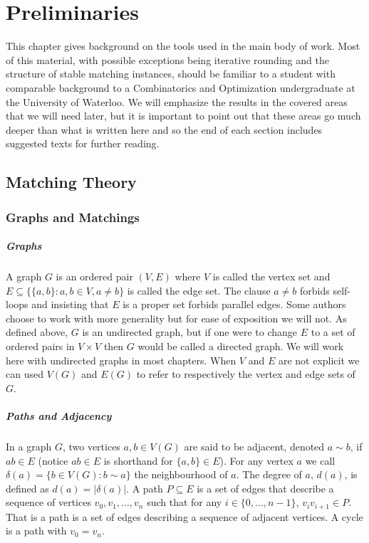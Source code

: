\chapter{Preliminaries}
This chapter gives background on the tools used in the main body of work. Most of this material, with possible exceptions being iterative rounding and the structure of stable matching instances, should be familiar to a student with comparable background to a Combinatorics and Optimization undergraduate at the University of Waterloo. We will emphasize the results in the covered areas that we will need later, but it is important to point out that these areas go much deeper than what is written here and so the end of each section includes suggested texts for further reading.

\section{Matching Theory}
\subsection{Graphs and Matchings}
\paragraph{Graphs} A graph $G$ is an ordered pair $(V,E)$ where $V$ is called the vertex set and $E \subseteq \{\{a,b\} : a,b \in V, a \neq b\}$ is called the edge set. The clause $a \neq b$ forbids self-loops and insisting that $E$ is a proper set forbids parallel edges. Some authors choose to work with more generality but for ease of exposition we will not. As defined above, $G$ is an undirected graph, but if one were to change $E$ to a set of ordered pairs in $V \times V$ then $G$ would be called a directed graph. We will work here with undirected graphs in most chapters. When $V$ and $E$ are not explicit we can used $V(G)$ and $E(G)$ to refer to respectively the vertex and edge sets of $G$.
\paragraph{Paths and Adjacency} In a graph $G$, two vertices $a,b \in V(G)$ are said to be adjacent, denoted $a \sim b$, if $ab \in E$ (notice $ab \in E$ is shorthand for $\{a,b\} \in E$). For any vertex $a$ we call $\delta(a) = \{b \in V(G): b \sim a\}$ the neighbourhood of $a$. The degree of $a$, $d(a)$, is defined as $d(a) = |\delta(a)|$. A path $P \subseteq E$ is a set of edges that describe a sequence of vertices $v_0, v_1, \dots, v_n$ such that for any $i \in \{0,\dots, n-1\}$, $v_iv_{i+1} \in P$. That is a path is a set of edges describing a sequence of adjacent vertices. A cycle is a path with $v_0 = v_n$.
